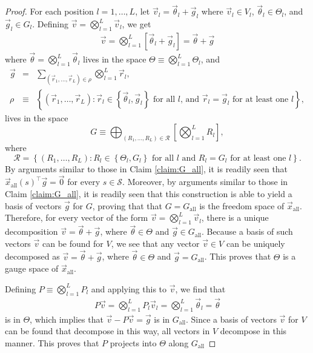 \documentclass{article}
\numberwithin{myclaim}{section}
\newcommand{\set}[1]{\left\{ #1 \right\}}
\begin{document}
\begin{proof}
For each position $l=1,\ldots,L$, let $\vec{v}_l = \vec{\theta}_l + \vec{g}_l$ where $\vec{v}_l \in V_l$, $\vec{\theta}_l \in \Theta_l$, and $\vec{g}_l \in G_l$. Defining $\vec{v} = \bigotimes_{l=1}^L \vec{v}_l$, we get
\begin{eqnarray}
\vec{v} = \bigotimes_{l=1}^L \left[ \vec{\theta}_l + \vec{g}_l \right] = \vec{\theta} + \vec{g}
\end{eqnarray}
where $\vec{\theta} = \bigotimes_{l=1}^L \vec{\theta}_l$ lives in the space $\Theta \equiv \bigotimes_{l=1}^L \Theta_l$, and 
\begin{eqnarray}
    \vec{g} &=& \sum_{(\vec{r}_1, \ldots, \vec{r}_L) \in \rho} \bigotimes_{l=1}^L \vec{r}_l, \\
    \rho &\equiv & \set{(\vec{r}_1, \ldots, \vec{r}_L): \vec{r}_l \in \set{\vec{\theta}_l,\vec{g}_l}\textrm{~for all $l$, and~}\vec{r}_l = \vec{g}_l \textrm{~for at least one $l$}},
\end{eqnarray}
lives in the space
    \begin{equation}
        G \equiv \bigoplus_{(R_1, \ldots, R_L) \in \mathcal{R}} \left[ \bigotimes_{l=1}^L R_l \right],
    \end{equation}
    where
    \begin{equation}
        \mathcal{R} = \set{(R_1, \ldots, R_L): \textrm{$R_l \in \set{\Theta_l, G_l}$ for all $l$ and $R_l = G_l$ for at least one $l$}}.
    \end{equation}
By arguments similar to those in Claim \ref{claim:G_all}, it is readily seen that $\vec{x}_\mathrm{all}(s)^\top \vec{g} = \vec{0}$ for every $s \in \mathcal{S}$. Moreover, by arguments similar to those in Claim \ref{claim:G_all}, it is readily seen that this construction is able to yield a basis of vectors $\vec{g}$ for $G$, proving that that $G = G_\mathrm{all}$ is the freedom space of $\vec{x}_\mathrm{all}$. Therefore, for every vector of the form $\vec{v} = \bigotimes_{l=1}^L \vec{v}_l$, there is a unique decomposition $\vec{v} = \vec{\theta} + \vec{g}$, where $\vec{\theta} \in \Theta$ and $\vec{g} \in G_\mathrm{all}$. Because a basis of such vectors $\vec{v}$ can be found for $V$, we see that any vector $\vec{v} \in V$ can be uniquely decomposed as $\vec{v} = \vec{\theta} + \vec{g}$, where $\vec{\theta} \in \Theta$ and $\vec{g} = G_\mathrm{all}$. This proves that $\Theta$ is a gauge space of $\vec{x}_\mathrm{all}$. 

Defining $P \equiv \bigotimes_{l=1}^L P_l$ and applying this to $\vec{v}$, we find that
\begin{eqnarray}
    P \vec{v} = \bigotimes_{l=1}^L P_l \vec{v}_l
    =  \bigotimes_{l=1}^L \vec{\theta}_l
    = \vec{\theta}
\end{eqnarray}
is in $\Theta$, which implies that $\vec{v} - P \vec{v} = \vec{g}$ is in $G_\mathrm{all}$. Since a basis of vectors $\vec{v}$ for $V$ can be found that decompose in this way, all vectors in $V$ decompose in this manner. This proves that $P$ projects into $\Theta$ along $G_\mathrm{all}$ 


\end{proof}
\end{document}
